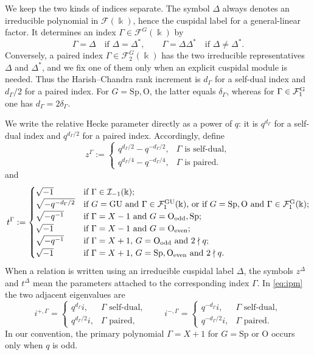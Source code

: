 \documentclass[12pt]{amsart}
\numberwithin{itemcounter}{subsection}
\theoremstyle{plain}
\theoremstyle{definition}
\theoremstyle{remark}
\numberwithin{equation}{section}
\def\k{\Bbbk}
\def\calF{\mathcal{F}}
\def\calI{\mathcal{I}}
\def\O{\mathrm{O}}
\def\Sp{\mathrm{Sp}}
\def\GU{\mathrm{GU}}
\begin{document}
We keep the two kinds of indices separate.  The symbol \(\Delta\) always denotes an irreducible polynomial in \(\mathcal F(\k)\), hence the cuspidal label for a general-linear factor.  It determines an index \(\Gamma\in\mathcal F^G(\k)\) by
\[
 \Gamma=\Delta\quad\text{if }\Delta=\Delta^*,
 \qquad
 \Gamma=\Delta\Delta^*\quad\text{if }\Delta\ne\Delta^*.
\]
Conversely, a paired index \(\Gamma\in\mathcal F^G_2(\k)\) has the two irreducible representatives \(\Delta\) and \(\Delta^*\), and we fix one of them only when an explicit cuspidal module is needed.  Thus the Harish--Chandra rank increment is \(d_\Gamma\) for a self-dual index and \(d_\Gamma/2\) for a paired index.  For \(G=\Sp,\O\), the latter equals \(\delta_\Gamma\), whereas for \(\Gamma\in\calF_1^{\rm G}\) one has \(d_\Gamma=2\delta_\Gamma\).

We write the relative Hecke parameter directly as a power of $q$: it is \(q^{d_\Gamma}\) for a self-dual index and \(q^{d_\Gamma/2}\) for a paired index.  Accordingly, define
\[
z^\Gamma:=
\begin{cases}
q^{d_\Gamma/2}-q^{-d_\Gamma/2},&\Gamma\text{ is self-dual},\\[2pt]
q^{d_\Gamma/4}-q^{-d_\Gamma/4},&\Gamma\text{ is paired}.
\end{cases}
\]
and
\begin{align}\label{def:t}
t^\Gamma:=
\begin{cases}
\sqrt{-1}
 & \text{if $\Gamma\in\calI_{-1}(\k)$};\\
\sqrt{-q^{-d_\Gamma/2}}
 & \text{if $G=\GU$ and $\Gamma\in\calF^{\GU}_1(\k)$, or if $G=\Sp,\rm O$ and $\Gamma\in\calF^{\rm G}_1(\k)$};\\
\sqrt{-q^{-1}}
 & \text{if $\Gamma=X-1$ and $G=\O_{\mathrm{odd}},\Sp$};\\
\sqrt{-1}
 & \text{if $\Gamma=X-1$ and $G=\O_{\mathrm{even}}$};\\
\sqrt{-q^{-1}}
 & \text{if $\Gamma=X+1$, $G=\O_{\mathrm{odd}}$ and $2\nmid q$};\\
\sqrt{-1}
 & \text{if $\Gamma=X+1$, $G=\Sp,\O_{\mathrm{even}}$ and $2\nmid q$}.
\end{cases}
\end{align}
When a relation is written using an irreducible cuspidal label \(\Delta\), the symbols \(z^\Delta\) and \(t^\Delta\) mean the parameters attached to the corresponding index \(\Gamma\).  In \eqref{eq:ipm} the two adjacent eigenvalues are
\[
i^{+,\Gamma}=\begin{cases}q^{d_\Gamma}i,&\Gamma\text{ self-dual},\\ q^{d_\Gamma/2}i,&\Gamma\text{ paired},\end{cases}
\qquad
i^{-,\Gamma}=\begin{cases}q^{-d_\Gamma}i,&\Gamma\text{ self-dual},\\ q^{-d_\Gamma/2}i,&\Gamma\text{ paired}.\end{cases}
\]
In our convention, the primary polynomial $\Gamma=X+1$ for $G=\Sp$ or $\O$ occurs only when $q$ is odd.
\end{document}
